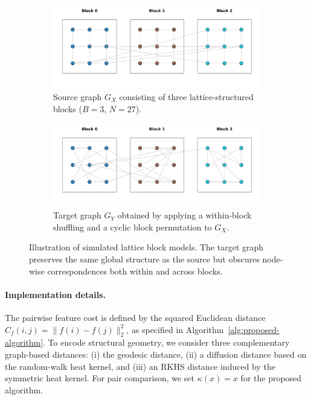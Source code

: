 \documentclass{article}
\begin{document}
\begin{figure}[t]
	\centering
	\begin{subfigure}{\textwidth}
		\includegraphics[width=\textwidth]{../simulation/source_lattice_blocks.png}
		\caption{Source graph $G_X$ consisting of three lattice-structured blocks ($B=3$, $N=27$).}
		\label{fig:data-example-source}
	\end{subfigure}
	\begin{subfigure}{\textwidth}
		\includegraphics[width=\textwidth]{../simulation/target_lattice_blocks.png}
		\caption{Target graph $G_Y$ obtained by applying a within-block shuffling and a cyclic block permutation to $G_X$.}
		\label{fig:data-example-target}
	\end{subfigure}
	\caption{Illustration of simulated lattice block models. The target graph preserves the same global structure as the source but obscures node-wise correspondences both within and across blocks.}
	\label{fig:data-example}
\end{figure}

\paragraph{Implementation details.}
The pairwise feature cost is defined by the squared Euclidean distance $C_f(i,j) = \|f(i) - f(j)\|_2^2$, as specified in Algorithm~\ref{alg:proposed-algorithm}.
To encode structural geometry, we consider three complementary graph-based distances: (i) the geodesic distance, (ii) a diffusion distance based on the random-walk heat kernel, and (iii) an RKHS distance induced by the symmetric heat kernel. For pair comparison, we set $\kappa(x) = x$ for the proposed algorithm.
\end{document}
